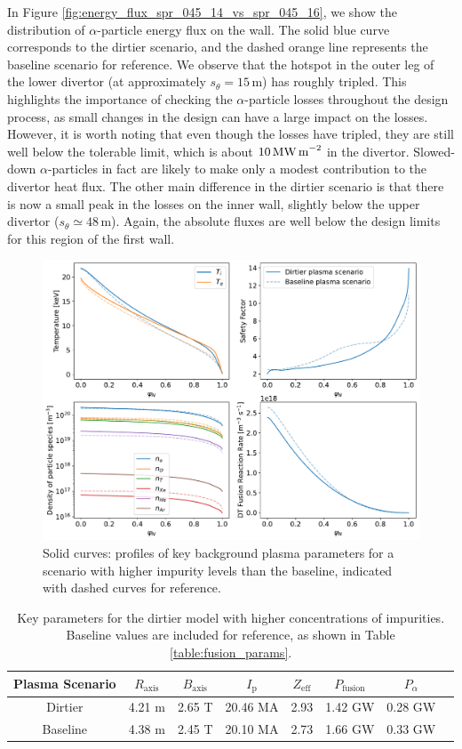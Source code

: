 \documentclass[10pt, a4paper, twoside]{article}
\begin{document}
In Figure \ref{fig:energy_flux_spr_045_14_vs_spr_045_16}, we show the distribution of $\alpha$-particle energy flux on the wall. The solid blue curve corresponds to the dirtier scenario, and the dashed orange line represents the baseline scenario for reference. We observe that the hotspot in the outer leg of the lower divertor (at approximately \( s_\theta=15\,\text{m} \)) has roughly tripled. This highlights the importance of checking the $\alpha$-particle losses throughout the design process, as small changes in the design can have a large impact on the losses. However, it is worth noting that even though the losses have tripled, they are still well below the tolerable limit, which is about \( 10\,\text{MW\,m}^{-2} \) in the divertor. Slowed-down $\alpha$-particles in fact are likely to make only a modest contribution to the divertor heat flux. The other main difference in the dirtier scenario is that there is now a small peak in the losses on the inner wall, slightly below the upper divertor ($s_{\theta} \simeq 48\,$m). Again, the absolute fluxes are well below the design limits for this region of the first wall.  

\begin{figure}[!ht]
    \centering
    \includegraphics[width=0.9\linewidth]{Figures/background_plasma_curves_14_vs_16.pdf}
    \caption{Solid curves: profiles of key background plasma parameters for a scenario with higher impurity levels than the baseline, indicated with dashed curves for reference.}
    \label{fig:plasma_profiles_spr_045_14}
\end{figure}

\begin{table}[!ht]
\centering
\begin{tabular}{cccccccc}
\hline
Plasma Scenario & $R_{\text{axis}}$ & $B_{\text{axis}}$ & $I_{\text{p}}$ & $Z_{\text{eff}}$ & $P_{\text{fusion}}$ & $P_{\alpha}$ \\
\hline
Dirtier & 4.21 m & 2.65 T & 20.46 MA & 2.93 & 1.42 GW & 0.28 GW \\
Baseline & 4.38 m & 2.45 T & 20.10 MA & 2.73 & 1.66 GW & 0.33 GW \\
\hline
\end{tabular}
\caption{Key parameters for the dirtier model with higher concentrations of impurities. Baseline values are included for reference, as shown in Table \ref{table:fusion_params}.}
\label{table:fusion_params_dirty}
\end{table}
\end{document}
